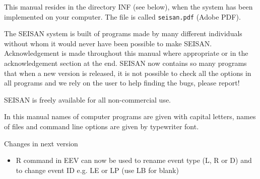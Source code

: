 This manual resides in the directory INF (see below), when the system 
has been implemented on your computer. The file is called 
\texttt{seisan.pdf} (Adobe PDF). 

The SEISAN system is built of programs made by many different individuals without whom it would never have been possible to make SEISAN. Acknowledgement is made throughout this manual where appropriate or in the acknowledgement section at the end. SEISAN now contains so many programs that when a new version is released, it is not possible to check all the options in all programs and we rely on the user to help finding the bugs, please report! 

SEISAN is freely available for all non-commercial use. 

In this manual names of computer programs are given with capital letters, names of 
files and command line options are given by typewriter font.


Changes in next version
\begin{itemize}
\item R command in EEV can now be used to rename event type (L, R or D) and to change event ID e.g. LE or LP (use LB for blank)
\end{itemize}

